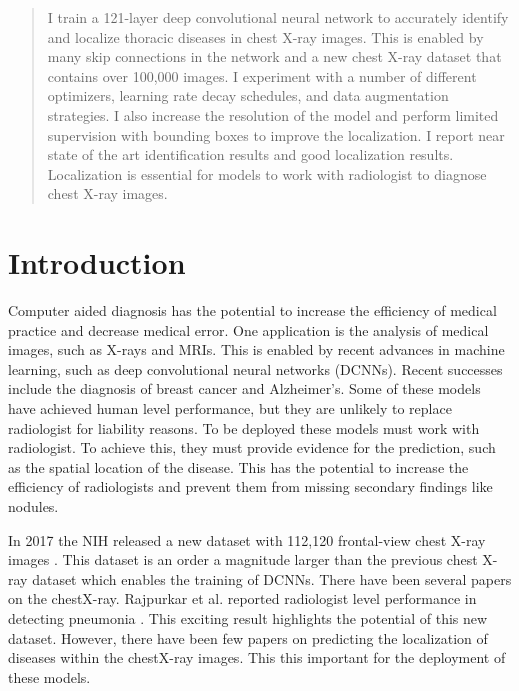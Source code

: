 \documentclass{article}
\begin{document}

\begin{abstract}
I train a 121-layer deep convolutional neural network to accurately identify and localize thoracic diseases in chest X-ray images. This is enabled by many skip connections in the network and a new chest X-ray dataset that contains over 100,000 images. I experiment with a number of different optimizers, learning rate decay schedules, and data augmentation strategies. I also increase the resolution of the model and perform limited supervision with bounding boxes to improve the localization. I report near state of the art identification results and good localization results. Localization is essential for models to work with radiologist to diagnose chest X-ray images.
\end{abstract}


\section{Introduction}
\label{introduction}
Computer aided diagnosis has the potential to increase the efficiency of medical practice and decrease medical error. One application is the analysis of medical images, such as X-rays and MRIs. This is enabled by recent advances in machine learning, such as deep convolutional neural networks (DCNNs). Recent successes include the diagnosis of breast cancer and Alzheimer’s. Some of these models have achieved human level performance, but they are unlikely to replace radiologist for liability reasons. To be deployed these models must work with radiologist. To achieve this, they must provide evidence for the prediction, such as the spatial location of the disease. This has the potential to increase the efficiency of radiologists and prevent them from missing secondary findings like nodules.

In 2017 the NIH released a new dataset with 112,120 frontal-view chest X-ray images \cite{Wang}. This dataset is an order a magnitude larger than the previous chest X-ray dataset which enables the training of DCNNs. There have been several papers on the chestX-ray. Rajpurkar et al. reported radiologist level performance in detecting pneumonia \cite{Rajpurkar}. This exciting result highlights the potential of this new dataset. However, there have been few papers on predicting the localization of diseases within the chestX-ray images. This this important for the deployment of these models.
\end{document}
